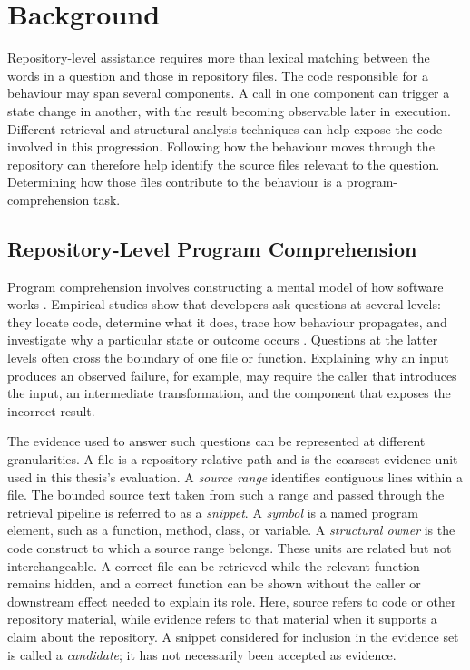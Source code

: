 \chapter{Background}\label{ch:background}

Repository-level assistance requires more than lexical matching between the words in a question and those in repository files. The code responsible for a behaviour may span several components. A call in one component can trigger a state change in another, with the result becoming observable later in execution. Different retrieval and structural-analysis techniques can help expose the code involved in this progression. Following how the behaviour moves through the repository can therefore help identify the source files relevant to the question. Determining how those files contribute to the behaviour is a program-comprehension task.

\section{Repository-Level Program Comprehension}\label{sec:repository-level-program-comprehension}

Program comprehension involves constructing a mental model of how software works \textcite{Heinonen2023MentalModels}. Empirical studies show that developers ask questions at several levels: they locate code, determine what it does, trace how behaviour propagates, and investigate why a particular state or outcome occurs \textcite{Ko2007InformationNeeds,Sillito2008ProgrammingQuestions}. Questions at the latter levels often cross the boundary of one file or function. Explaining why an input produces an observed failure, for example, may require the caller that introduces the input, an intermediate transformation, and the component that exposes the incorrect result.

The evidence used to answer such questions can be represented at different granularities. A file is a repository-relative path and is the coarsest evidence unit used in this thesis's evaluation. A \emph{source range} identifies contiguous lines within a file. The bounded source text taken from such a range and passed through the retrieval pipeline is referred to as a \emph{snippet}. A \emph{symbol} is a named program element, such as a function, method, class, or variable. A \emph{structural owner} is the code construct to which a source range belongs. These units are related but not interchangeable. A correct file can be retrieved while the relevant function remains hidden, and a correct function can be shown without the caller or downstream effect needed to explain its role. Here, source refers to code or other repository material, while evidence refers to that material when it supports a claim about the repository. A snippet considered for inclusion in the evidence set is called a \emph{candidate}; it has not necessarily been accepted as evidence.

